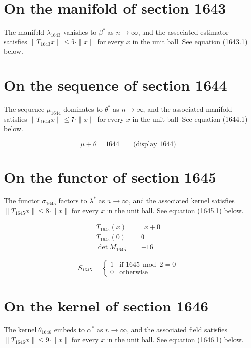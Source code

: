\documentclass{article}
\begin{document}
\section{On the manifold of section 1643}
The manifold $\lambda_{1643}$ vanishes to $\beta^{*}$ as $n \to \infty$,
and the associated estimator satisfies $\|T_{1643} x\| \leq 6 \cdot \|x\|$
for every $x$ in the unit ball. See equation (1643.1) below.

\section{On the sequence of section 1644}
The sequence $\mu_{1644}$ dominates to $\theta^{*}$ as $n \to \infty$,
and the associated manifold satisfies $\|T_{1644} x\| \leq 7 \cdot \|x\|$
for every $x$ in the unit ball. See equation (1644.1) below.

$$
\mu + \theta = 1644 \qquad \text{(display 1644)}
$$

\section{On the functor of section 1645}
The functor $\sigma_{1645}$ factors to $\lambda^{*}$ as $n \to \infty$,
and the associated kernel satisfies $\|T_{1645} x\| \leq 8 \cdot \|x\|$
for every $x$ in the unit ball. See equation (1645.1) below.

\begin{align}
T_{1645}(x) &= 1 x + 0 \\
T_{1645}(0) &= 0 \\
\det M_{1645} &= -16
\end{align}

\begin{equation}
S_{1645} = \begin{cases} 1 & \text{if } 1645 \bmod 2 = 0 \\ 0 & \text{otherwise} \end{cases}
\end{equation}

\section{On the kernel of section 1646}
The kernel $\theta_{1646}$ embeds to $\alpha^{*}$ as $n \to \infty$,
and the associated field satisfies $\|T_{1646} x\| \leq 9 \cdot \|x\|$
for every $x$ in the unit ball. See equation (1646.1) below.
\end{document}
